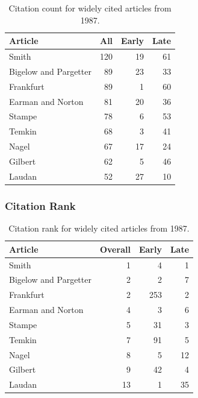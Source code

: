 \documentclass[
  10pt,
  letterpaper,
  DIV=11,
  numbers=noendperiod,
  twoside]{scrartcl}
\begin{document}
\begin{longtable}[]{@{}lrrr@{}}

\caption{\label{tbl-citation-count-1987}Citation count for widely cited
articles from 1987.}

\tabularnewline

\toprule\noalign{}
Article & All & Early & Late \\
\midrule\noalign{}
\endhead
\bottomrule\noalign{}
\endlastfoot
Smith & 120 & 19 & 61 \\
Bigelow and Pargetter & 89 & 23 & 33 \\
Frankfurt & 89 & 1 & 60 \\
Earman and Norton & 81 & 20 & 36 \\
Stampe & 78 & 6 & 53 \\
Temkin & 68 & 3 & 41 \\
Nagel & 67 & 17 & 24 \\
Gilbert & 62 & 5 & 46 \\
Laudan & 52 & 27 & 10 \\

\end{longtable}

\subsubsection*{Citation Rank}\label{sec-rank-1987}

\begin{longtable}[]{@{}lrrr@{}}

\caption{\label{tbl-citation-rank-1987}Citation rank for widely cited
articles from 1987.}

\tabularnewline

\toprule\noalign{}
Article & Overall & Early & Late \\
\midrule\noalign{}
\endhead
\bottomrule\noalign{}
\endlastfoot
Smith & 1 & 4 & 1 \\
Bigelow and Pargetter & 2 & 2 & 7 \\
Frankfurt & 2 & 253 & 2 \\
Earman and Norton & 4 & 3 & 6 \\
Stampe & 5 & 31 & 3 \\
Temkin & 7 & 91 & 5 \\
Nagel & 8 & 5 & 12 \\
Gilbert & 9 & 42 & 4 \\
Laudan & 13 & 1 & 35 \\

\end{longtable}
\end{document}
